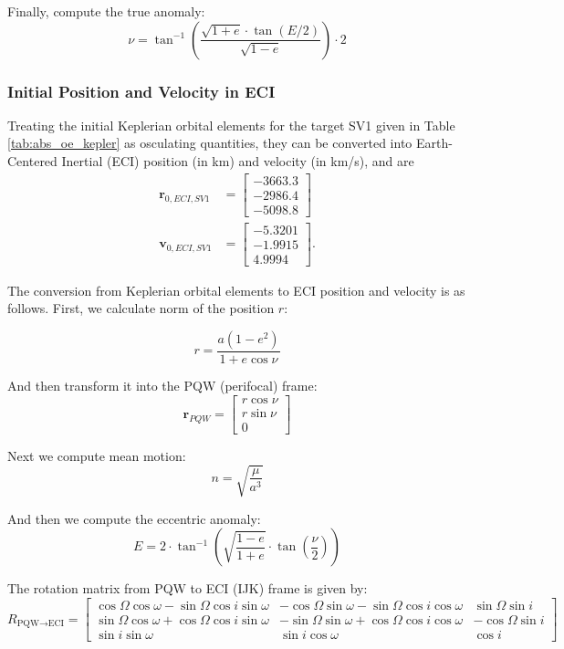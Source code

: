 Finally, compute the true anomaly:
\[
\nu = \tan^{-1} \left( \frac{\sqrt{1 + e} \cdot \tan(E/2)}{\sqrt{1 - e}} \right) \cdot 2
\]

\subsubsection{Initial Position and Velocity in ECI}
 Treating the initial Keplerian orbital elements for the target SV1 given in Table \ref{tab:abs_oe_kepler} as osculating quantities, they can be converted into Earth-Centered Inertial (ECI) position (in km) and velocity (in km/s), and are 
 \begin{align*}
     \boldsymbol{r}_{0, ECI, SV1} &= \begin{bmatrix}
         -3663.3 \\
         -2986.4 \\
         -5098.8
     \end{bmatrix} \\
     \boldsymbol{v}_{0, ECI, SV1} &= \begin{bmatrix}
         -5.3201 \\
         -1.9915 \\
         4.9994
     \end{bmatrix}.
 \end{align*}

The conversion from Keplerian orbital elements to ECI position and velocity is as follows. First, we calculate norm of the position $r$:

\[
r = \frac{a(1 - e^2)}{1 + e \cos \nu}
\]

And then transform it into the PQW (perifocal) frame:
\[
\mathbf{r}_{PQW} = \begin{bmatrix}
r \cos \nu \\
r \sin \nu \\
0
\end{bmatrix}
\]

Next we compute mean motion:
\[
n = \sqrt{\frac{\mu}{a^3}}
\]

And then we compute the eccentric anomaly:
\[
E = 2 \cdot \tan^{-1} \left( \sqrt{\frac{1 - e}{1 + e}} \cdot \tan\left(\frac{\nu}{2}\right) \right)
\]

The rotation matrix from PQW to ECI (IJK) frame is given by:
\[
R_{\text{PQW} \to \text{ECI}} = 
\begin{bmatrix}
\cos\Omega\cos\omega - \sin\Omega\cos i\sin\omega & -\cos\Omega\sin\omega - \sin\Omega\cos i\cos\omega & \sin\Omega\sin i \\
\sin\Omega\cos\omega + \cos\Omega\cos i\sin\omega & -\sin\Omega\sin\omega + \cos\Omega\cos i\cos\omega & -\cos\Omega\sin i \\
\sin i\sin\omega & \sin i\cos\omega & \cos i
\end{bmatrix}
\]


